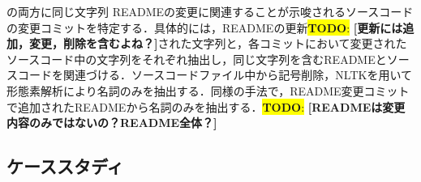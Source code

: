 \documentclass[uplatex,dvipdfmx,a4paper,twocolumn,base=11pt,jbase=11pt,ja=standard]{bxjsarticle}  %
\newcommand{\todo}[1]{\colorbox{yellow}{{\bf TODO}:}{\color{red} {\textbf{[#1]}}}}
\begin{document}
の両方に同じ文字列
READMEの変更に関連することが示唆されるソースコードの変更コミットを特定する．具体的には，READMEの更新\todo{更新には追加，変更，削除を含むよね？}された文字列と，各コミットにおいて変更されたソースコード中の文字列をそれぞれ抽出し，同じ文字列を含むREADMEとソースコードを関連づける．ソースコードファイル中から記号削除，NLTKを用いて形態素解析により名詞のみを抽出する．同様の手法で，README変更コミットで追加されたREADMEから名詞のみを抽出する．\todo{READMEは変更内容のみではないの？README全体？}


%
%




\subsection{ケーススタディ}
\end{document}
